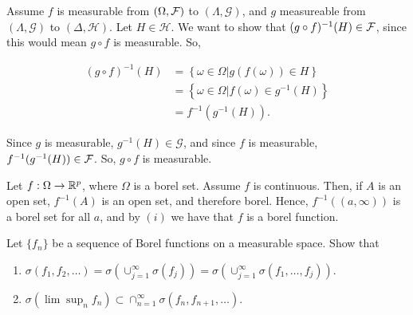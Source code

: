 \documentclass[]{book}
\providecommand{\tightlist}{%
  \setlength{\itemsep}{0pt}\setlength{\parskip}{0pt}}
\theoremstyle{definition}
\theoremstyle{definition}
\theoremstyle{definition}
\theoremstyle{remark}
\let\BeginKnitrBlock\begin \let\EndKnitrBlock\end
\begin{document}
\BeginKnitrBlock{solution}[Ex 14 (iii)]
\iffalse{} {Solution (Ex 14 (iii)). } \fi{}
\EndKnitrBlock{solution}

\BeginKnitrBlock{solution}[Ex 14 (iv)]
\iffalse{} {Solution (Ex 14 (iv)). } \fi{}Assume \(f\) is measurable
from \((\Omega, \mathcal{F})\) to \((\Lambda, \mathcal{G})\), and \(g\)
measureable from \((\Lambda, \mathcal{G})\) to
\((\Delta, \mathcal{H})\). Let \(H \in \mathcal{H}\). We want to show
that \((g \circ f)^{-1}(H) \in \mathcal{F}\), since this would mean \(g \circ f\)
is measurable. So,

\[\begin{aligned}
  (g \circ f)^{-1}(H) &= \left\{ \omega \in \Omega | g(f(\omega)) \in H \right\} \\ 
                      &= \left\{ \omega \in \Omega | f(\omega) \in g^{-1}(H) \right\} \\ 
                      &= f^{-1}(g^{-1}(H)).
\end{aligned}\]

Since \(g\) is measurable, \(g^{-1}(H) \in \mathcal{G}\), and since
\(f\) is measurable, \(f^{-1}(g^{-1}(H)) \in \mathcal{F}\). So, \(g \circ f\) is
measurable.
\EndKnitrBlock{solution}

\BeginKnitrBlock{solution}[Ex 14 (v)]
\iffalse{} {Solution (Ex 14 (v)). } \fi{}Let
\(f: \Omega \rightarrow \mathbb{R}^p\), where \(\Omega\) is a borel set. Assume
\(f\) is continuous. Then, if \(A\) is an open set, \(f^{-1}(A)\) is an
open set, and therefore borel. Hence, \(f^{-1}((a,\infty))\) is a borel
set for all \(a\), and by \((i)\) we have that \(f\) is a borel
function.
\EndKnitrBlock{solution}

\BeginKnitrBlock{exercise}[Ex 19]
\protect\hypertarget{exr:unnamed-chunk-33}{}{\label{exr:unnamed-chunk-33}
\iffalse (Ex 19) \fi{} } Let \(\{f_n\}\) be a sequence of Borel
functions on a measurable space. Show that

\begin{enumerate}
\def\labelenumi{\alph{enumi})}
\tightlist
\item
  \(\sigma(f_1, f_2, \ldots) = \sigma(\cup_{j=1}^{\infty} \sigma(f_j)) = \sigma(\cup_{j=1}^\infty \sigma(f_1,\ldots, f_j)).\)
\item
  \(\sigma(\lim \sup_n f_n) \subset \cap_{n=1}^\infty \sigma(f_n, f_{n+1},\ldots).\)
\end{enumerate}
\EndKnitrBlock{exercise}

\BeginKnitrBlock{solution}[Ex 19]
\iffalse{} {Solution (Ex 19). } \fi{}
\EndKnitrBlock{solution}
\end{document}
